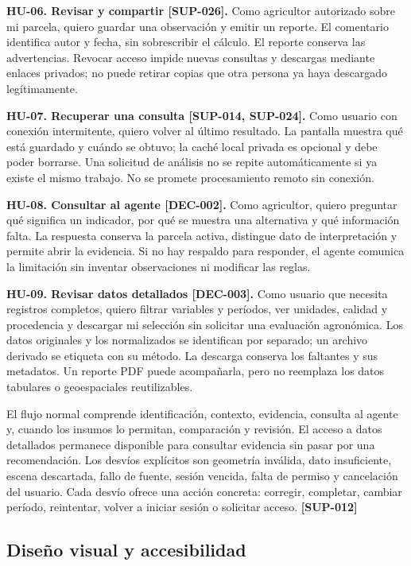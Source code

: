 \documentclass[10pt,a4paper]{article}
\begin{document}
\textbf{HU-06. Revisar y compartir [SUP-026].} Como agricultor autorizado sobre mi parcela, quiero guardar una observación y emitir un reporte. El comentario identifica autor y fecha, sin sobrescribir el cálculo. El reporte conserva las advertencias. Revocar acceso impide nuevas consultas y descargas mediante enlaces privados; no puede retirar copias que otra persona ya haya descargado legítimamente.


\textbf{HU-07. Recuperar una consulta [SUP-014, SUP-024].} Como usuario con conexión intermitente, quiero volver al último resultado. La pantalla muestra qué está guardado y cuándo se obtuvo; la caché local privada es opcional y debe poder borrarse. Una solicitud de análisis no se repite automáticamente si ya existe el mismo trabajo. No se promete procesamiento remoto sin conexión.


\textbf{HU-08. Consultar al agente [DEC-002].} Como agricultor, quiero preguntar qué significa un indicador, por qué se muestra una alternativa y qué información falta. La respuesta conserva la parcela activa, distingue dato de interpretación y permite abrir la evidencia. Si no hay respaldo para responder, el agente comunica la limitación sin inventar observaciones ni modificar las reglas.


\textbf{HU-09. Revisar datos detallados [DEC-003].} Como usuario que necesita registros completos, quiero filtrar variables y períodos, ver unidades, calidad y procedencia y descargar mi selección sin solicitar una evaluación agronómica. Los datos originales y los normalizados se identifican por separado; un archivo derivado se etiqueta con su método. La descarga conserva los faltantes y sus metadatos. Un reporte PDF puede acompañarla, pero no reemplaza los datos tabulares o geoespaciales reutilizables.


El flujo normal comprende identificación, contexto, evidencia, consulta al agente y, cuando los insumos lo permitan, comparación y revisión. El acceso a datos detallados permanece disponible para consultar evidencia sin pasar por una recomendación. Los desvíos explícitos son geometría inválida, dato insuficiente, escena descartada, fallo de fuente, sesión vencida, falta de permiso y cancelación del usuario. Cada desvío ofrece una acción concreta: corregir, completar, cambiar período, reintentar, volver a iniciar sesión o solicitar acceso. \textbf{[SUP-012]}


\subsection{Diseño visual y accesibilidad}
\end{document}
